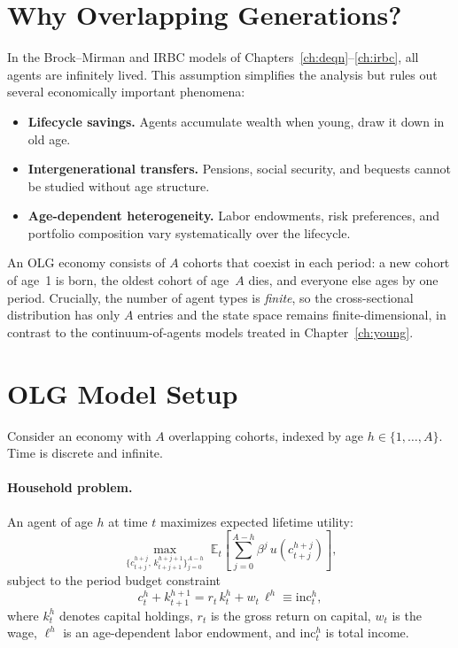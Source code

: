 \documentclass[11pt,a4paper]{report}
\begin{document}
\section{Why Overlapping Generations?}
\label{sec:olg_why}

In the Brock--Mirman and IRBC models of Chapters~\ref{ch:deqn}--\ref{ch:irbc}, all agents are infinitely lived.  This assumption simplifies the analysis but rules out several economically important phenomena:
\begin{itemize}[itemsep=2pt]
\item \textbf{Lifecycle savings.}  Agents accumulate wealth when young, draw it down in old age.
\item \textbf{Intergenerational transfers.}  Pensions, social security, and bequests cannot be studied without age structure.
\item \textbf{Age-dependent heterogeneity.}  Labor endowments, risk preferences, and portfolio composition vary systematically over the lifecycle.
\end{itemize}

An OLG economy consists of $A$ cohorts that coexist in each period: a new cohort of age~1 is born, the oldest cohort of age~$A$ dies, and everyone else ages by one period.  Crucially, the number of agent types is \emph{finite}, so the cross-sectional distribution has only $A$ entries and the state space remains finite-dimensional, in contrast to the continuum-of-agents models treated in Chapter~\ref{ch:young}.

\section{OLG Model Setup}
\label{sec:olg_setup}

Consider an economy with $A$ overlapping cohorts, indexed by age $h \in \{1,\ldots,A\}$.  Time is discrete and infinite.

\paragraph{Household problem.}
An agent of age $h$ at time $t$ maximizes expected lifetime utility:
\begin{equation}
\max_{\{c_{t+j}^{h+j},\, k_{t+j+1}^{h+j+1}\}_{j=0}^{A-h}} \;\mathbb{E}_t\!\left[\sum_{j=0}^{A-h} \beta^j\, u(c_{t+j}^{h+j})\right],
\label{eq:olg_hh}
\end{equation}
subject to the period budget constraint
\begin{equation}
c_t^h + k_{t+1}^{h+1} = r_t \, k_t^h + w_t \, \ell^h \equiv \mathrm{inc}_t^h,
\label{eq:olg_budget}
\end{equation}
where $k_t^h$ denotes capital holdings, $r_t$ is the gross return on capital, $w_t$ is the wage, $\ell^h$ is an age-dependent labor endowment, and $\mathrm{inc}_t^h$ is total income.
\end{document}
